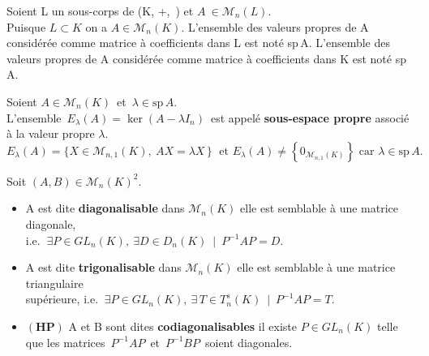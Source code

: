 \vspace{1.5cm}

Soient L un sous-corps de (K, +,\, \x) et \(A\ \in \mathcal{M}_{n}(L)\).\\
Puisque \(L\subset K\) on a \(A \in \mathcal{M}_{n}(K)\). L'ensemble des valeurs propres de A considérée comme matrice à coefficients dans L est noté sp\,A. L'ensemble des valeurs propres de A considérée comme matrice à coefficients dans K est noté sp\,A.

\vspace{1.3cm}

Soient \(A\in \mathcal{M}_n(K)\,\) et \(\,\lambda \in \text{sp}\,A.\)\vspace{0.1cm}\\
L'ensemble \(\,E_\lambda(A)=\ker (A-\lambda I_n)\,\) est appelé \textbf{sous-espace propre} associé à la valeur propre $\lambda$.\vspace{0.1cm}
\(E_\lambda(A)=\{X\in \mathcal{M}_{n,1}(K),\ AX=\lambda X\,\}\; \text{ et } E_\lambda(A)\neq \left\{0_{\mathcal{M}_{n,1}(K)}\right\} \text{ car } \lambda\in \text{sp}\,A.\) 

\vspace{1.4cm}

Soit \((A,B)\in \mathcal{M}_n(K)^2\).\vspace{-0.1cm}
\begin{itemize}[leftmargin=0.5cm, label=•]
    \item A est dite \textbf{diagonalisable} dans \(\mathcal{M}_n(K)\) \ssi elle est semblable à une matrice diagonale,\vspace{0.1cm}\\
    i.e. \(\ \exists P \in GL_n(K),\ \exists D\in D_n(K) \ \mid \ P^{-1}AP=D.\)\vspace{0.1cm}

    \item A est dite \textbf{trigonalisable} dans \(\mathcal{M}_n(K)\) \ssi elle est semblable à une matrice triangulaire\vspace{0.1cm}\\
    supérieure, i.e. \(\ \exists P \in GL_n(K),\ \exists\, T\in T_n^s(K) \ \mid \ P^{-1}AP=T.\)\vspace{0.1cm}
    
    \item \(\left(\mathbf{H} \mathbf{P} \right)\) A et B sont dites \textbf{codiagonalisables} \ssi il existe \(P\in GL_n(K)\) telle que les matrices \(\,P^{-1}AP\,\) et \(\,P^{-1}BP\,\) soient diagonales.
\end{itemize}

